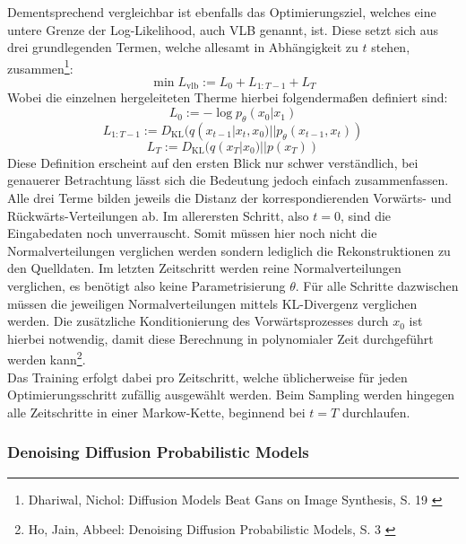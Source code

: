 Dementsprechend vergleichbar ist ebenfalls das Optimierungsziel, welches eine untere Grenze der Log-Likelihood, auch \ac{VLB} genannt, ist. Diese setzt sich aus drei grundlegenden Termen, welche allesamt in Abhängigkeit zu $t$ stehen, zusammen\footnote{
    Dhariwal, Nichol: Diffusion Models Beat Gans on Image Synthesis, S. 19
    \cite{dhariwal2021diffusionmodelsbeatgans}
}:
\begin{equation}
    \min L_\text{vlb} := L_0 + L_{1:T-1} + L_T 
\end{equation}
Wobei die einzelnen hergeleiteten Therme hierbei folgendermaßen definiert sind:
\begin{equation}
    L_0 := -\log p_\theta(x_0|x_1)
\end{equation}
\begin{equation}
    L_{1:T-1} := D_\text{KL}(q(x_{t-1}|x_t,x_0)||p_\theta(x_{t-1},x_t))
\end{equation}
\begin{equation}
    L_T := D_\text{KL}(q(x_T|x_0)||p(x_T))
\end{equation}
Diese Definition erscheint auf den ersten Blick nur schwer verständlich, bei genauerer Betrachtung lässt sich die Bedeutung jedoch einfach zusammenfassen. Alle drei Terme bilden jeweils die Distanz der korrespondierenden Vorwärts- und Rückwärts-Verteilungen ab. Im allerersten Schritt, also $t=0$, sind die Eingabedaten noch unverrauscht. Somit müssen hier noch nicht die Normalverteilungen verglichen werden sondern lediglich die Rekonstruktionen zu den Quelldaten. Im letzten Zeitschritt werden reine Normalverteilungen verglichen, es benötigt also keine Parametrisierung $\theta$. Für alle Schritte dazwischen müssen die jeweiligen Normalverteilungen mittels KL-Divergenz verglichen werden. Die zusätzliche Konditionierung des Vorwärtsprozesses durch $x_0$ ist hierbei notwendig, damit diese Berechnung in polynomialer Zeit durchgeführt werden kann\footnote{
    Ho, Jain, Abbeel: Denoising Diffusion Probabilistic Models, S. 3
    \cite{ho2020denoisingdiffusionprobabilisticmodels}
}. \\
Das Training erfolgt dabei pro Zeitschritt, welche üblicherweise für jeden Optimierungsschritt zufällig ausgewählt werden. Beim Sampling werden hingegen alle Zeitschritte in einer Markow-Kette, beginnend bei $t=T$ durchlaufen. 


\subsubsection{Denoising Diffusion Probabilistic Models}

